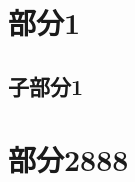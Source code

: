 \documentclass[12pt,hyperref,a4paper,UTF8]{ctexart}
\begin{document}
\mytitle

\section{部分1}
\subsection{子部分1}
\newpage
\section{部分2888}

\end{document}
